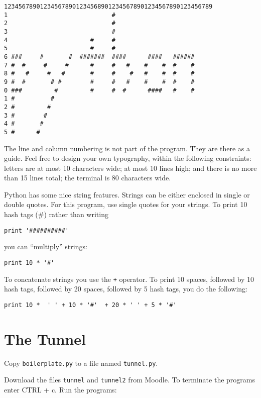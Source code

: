 \documentclass[12pt]{article}
\begin{document}
\begin{lstlisting}[style=bash]
 1234567890123456789012345689012345678901234567890123456789
1                             #     
2                             #
3                             #
4                       #     #
5                       #     #                
6 ###     #       #  #######  ####      ####   ######     
7 #  #     #     #      #     #   #    #    #  #    #
8 #   #     #   #       #     #    #   #    #  #    #
9 #  #       # #        #     #   #    #    #  #    #
0 ###         #         #     #  #      ####   #    #
1 #          #       
2 #         #
3 #        #
4 #       #
5 #      #
\end{lstlisting}

The line and column numbering is not part of the program. They are there as a guide. Feel free to design your own typography, within the following constraints: letters are at most 10 characters wide; at most 10 lines high; and there is no more than 15 lines total; the terminal is 80 characters wide.

Python has some nice string features. Strings can be either enclosed in single or double quotes. For this program, use single quotes for your strings. To print 10 hash tags (\#) rather than writing

\begin{lstlisting}[style=c]
print '##########'
\end{lstlisting}
 
you can ``multiply'' strings:

\begin{lstlisting}[style=c]
print 10 * '#' 
\end{lstlisting}

To concatenate strings you use the \texttt{+} operator. To print 10 spaces, followed by 10 hash tags, followed by 20 spaces, followed by 5 hash tags, you do the following:

\begin{lstlisting}[style=c]
print 10 *  ' ' + 10 * '#'  + 20 * ' ' + 5 * '#'
\end{lstlisting}

\section{The Tunnel}

Copy \texttt{boilerplate.py} to a file named \texttt{tunnel.py}. 

Download the files \texttt{tunnel} and \texttt{tunnel2} from Moodle. To terminate the programs enter CTRL + c. Run the programs:
\end{document}

